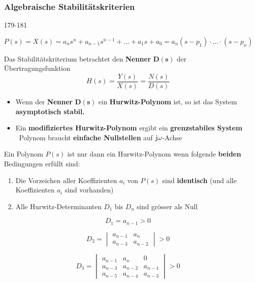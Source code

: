 \subsubsection{Algebraische Stabilitätskriterien}{179-181}

\vspace{-0.2cm}
$$ P(s) = X(s) = a_n s^n + a_{n-1} s^{n-1} + ... + a_1 s + a_0 = a_n(s-p_1) \cdot ... \cdot (s-p_n) $$

Das Stabilitätskriterium betrachtet den \textbf{Nenner} $\boldsymbol{D(s)}$ der Übertragungsfunktion 
$$ H(s) = \frac{Y(s)}{X(s)} = \frac{N(s)}{D(s)}$$

\begin{itemize}
	\item Wenn der \textbf{Nenner} $\boldsymbol{D(s)}$ ein \textbf{Hurwitz-Polynom} ist, so ist das System \textbf{asymptotisch stabil.}
	\item Ein \textbf{modifiziertes Hurwitz-Polynom} ergibt ein \textbf{grenzstabiles System} \\
		\textrightarrow\ Polynom braucht \textbf{einfache Nullstellen} auf $\mathrm{j} \omega$-Achse
\end{itemize}

\vspace{0.3cm}


\vspace{0.1cm}

Ein Polynom $P(s)$ ist nur dann ein Hurwitz-Polynom wenn folgende \textbf{beiden} Bedingungen erfüllt sind: 

\vspace{0.1cm}

\begin{enumerate}
	\item Die Vorzeichen aller Koeffizienten $a_i$ von $P(s)$ sind \textbf{identisch} (und alle Koeffizienten $a_i$ sind vorhanden)
	\item Alle Hurwitz-Determinanten $D_1$ bis $D_n$ sind grösser als Null
\end{enumerate}

\vspace{0.3cm}


\begin{minipage}[c]{0.23\columnwidth}
	$$ D_1 = a_{n-1} > 0 $$
\end{minipage}
\hfill
\begin{minipage}[c]{0.27\columnwidth}
	$$ D_2 = 
	\begin{vmatrix}
		a_{n-1} & a_n \\
		a_{n-3} & a_{n-2} 
	\end{vmatrix}  > 0 $$
\end{minipage}
\hfill
\begin{minipage}[c]{0.45\columnwidth}
	$$ D_3 = \begin{vmatrix}
		a_{n-1} & a_n 		& 0			\\	
		a_{n-3} & a_{n-2} 	& a_{n-1} 	\\
		a_{n-5} & a_{n-4} 	& a_{n-3} 
	\end{vmatrix}  > 0 $$
\end{minipage}


